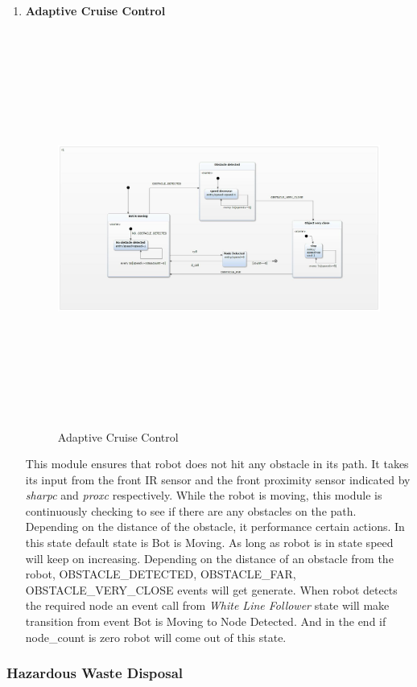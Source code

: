 \documentclass[a4paper,12pt,oneside]{article}
\begin{document}
\begin{enumerate}
\item \textbf{Adaptive Cruise Control}\\
\begin{figure}[H]
\centering
\includegraphics[width=16cm,height=13cm,angle=90]{4.jpg}
\caption{Adaptive Cruise Control}
\end{figure}
\newpage
This module ensures that robot does not hit any obstacle in its path. It takes its input from the front IR sensor and the front proximity sensor indicated by \textit{sharpc} and \textit{proxc} respectively. While the robot is moving, this module is continuously checking to see if there are any obstacles on the path. Depending on the distance of the obstacle, it performance certain actions. In this state default state is Bot is Moving. As long as robot is in state speed will keep on increasing. Depending on the distance of an obstacle from the robot, {OBSTACLE\_DETECTED}, {OBSTACLE\_FAR}, {OBSTACLE\_VERY\_CLOSE} events will get generate. When robot detects the required node an event call from \emph{White Line Follower} state will make transition from event Bot is Moving to Node Detected. And in the end if {node\_coun}t is zero robot will come out of this state.\\
\end{enumerate}
\subsubsection{Hazardous Waste Disposal}
\end{document}
